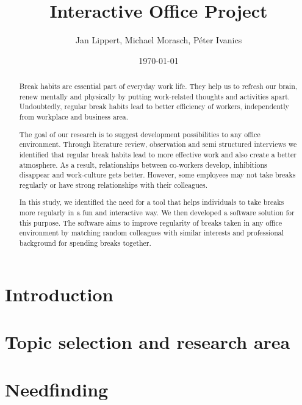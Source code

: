 \documentclass[english]{tktltiki}
\begin{document}
\onehalfspacing

\title{Interactive Office Project}
\author{Jan Lippert, Michael Morasch, P\'eter Ivanics}
\date{\today}

\maketitle


\begin{abstract}
Break habits are essential part of everyday work life. They help us to refresh our brain, renew mentally and physically by putting work-related thoughts and activities apart. Undoubtedly, regular break habits lead to better efficiency of workers, independently from workplace and business area.

The goal of our research is to suggest development possibilities to any office environment. Through literature review, observation and semi structured interviews we identified that regular break habits lead to more effective work and also create a better atmosphere. As a result, relationships between co-workers develop, inhibitions disappear and work-culture gets better. However, some employees may not take breaks regularly or have strong relationships with their colleagues. 

In this study, we identified the need for a tool that helps individuals to take breaks more regularly in a fun and interactive way. We then developed a software solution for this purpose. The software aims to improve regularity of breaks taken in any office environment by matching random colleagues with similar interests and professional background for spending breaks together. 
\end{abstract}

\mytableofcontents

\section{Introduction}


\section{Topic selection and research area}


\section{Needfinding}
\end{document}
